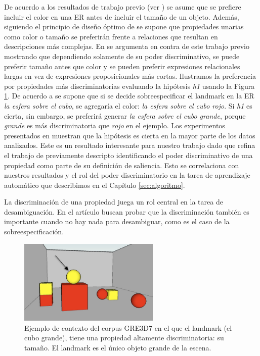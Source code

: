 De acuerdo a los resultados de trabajo previo (ver \cite{Pechmann1989}) se asume que se prefiere incluir el color en una ER antes de incluir el tama\~no de un objeto. 
Adem\'as, siguiendo el principio de dise\~no \'optimo de \cite{clark1992arenas} se supone que propiedades unarias como color o tama\~no se preferir\'an frente a relaciones que resultan en descripciones m\'as complejas. En \cite{acl-Paraboni15} se argumenta en contra de este trabajo previo mostrando que dependiendo solamente de su poder discriminativo, se puede preferir tama\~no antes que color y se pueden preferir expresiones relacionales largas en vez de expresiones proposicionales m\'as cortas.
Ilustramos la preferencia por propiedades m\'as discriminatorias evaluando la hip\'otesis \textit{h1} usando la Figura \ref{fig-2-2}. De acuerdo a \cite{Pechmann1989} se supone que si se decide sobreespecificar el landmark en la ER \emph{la esfera sobre el cubo}, se agregar\'ia el color: \emph{la esfera sobre el cubo rojo}. Si \textit{h1} es cierta, sin embargo, se preferir\'a generar \emph{la esfera sobre el cubo grande}, porque \emph{grande} es m\'as discriminatoria que \emph{rojo} en el ejemplo. Los experimentos presentados en \cite{acl-Paraboni15} muestran que la hip\'otesis es cierta en la mayor parte de los datos analizados. Este es un resultado interesante para nuestro trabajo dado que refina el trabajo de \cite{keysar:Curr98} previamente descripto identificando el poder discriminativo de una propiedad como parte de su definici\'on de saliencia.
Esto se correlaciona con nuestros resultados y el rol del poder discriminatorio en la tarea de aprendizaje autom\'atico que describimos en el Cap\'itulo \ref{sec:algoritmo}.

La discriminaci\'on de una propiedad juega un rol central en la tarea de desambiguaci\'on. En el art\'iculo buscan probar que la discriminaci\'on tambi\'en es importante cuando no hay nada para desambiguar, como es el caso de la sobreespecificaci\'on.




\begin{figure}[ht]
\begin{center}
\includegraphics[width=0.6\textwidth]{images/7.jpg}
\end{center}
\caption{Ejemplo de contexto del corpus GRE3D7 en el que el landmark (el cubo grande), tiene una propiedad altamente discriminatoria: su tama\~no. El landmark es el \'unico objeto grande de la escena.}
\label{fig-2-2}
\end{figure}


